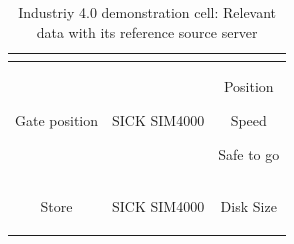 \documentclass[5p,times,procedia]{elsarticle}
\begin{document}
\begin{table}
\begin{adjustbox}{width=.45\textwidth}
\begin{tabular}{ c c c }
\begin{minipage}[t]{0.2\textwidth}
\begin{description}
                     \end{description}
                     \end{minipage} \\ \hline
              Gate position        & SICK SIM4000      & \begin{minipage}[t]{0.2\textwidth}
              \begin{description}
                     \item Position
                     \item Speed
                     \item Safe to go
                     \end{description}
                     \end{minipage} \\ \hline
              Store       & SICK SIM4000      & \begin{minipage}[t]{0.2\textwidth}
                     \begin{description}
                     \item Disk Size
                     \end{description}
                   \end{minipage} \\ \bottomrule
       \end{tabular}
       \end{adjustbox}
       \caption{Industriy 4.0 demonstration cell: Relevant data with its reference source server}
       \label{tab:data_source}
\end{table}
\end{document}

